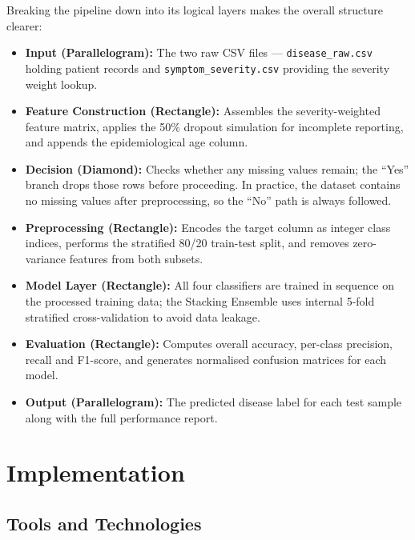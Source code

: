 \documentclass[12pt,a4paper]{article}
\begin{document}
\noindent
Breaking the pipeline down into its logical layers makes the overall structure clearer:

\begin{itemize}
    \item \textbf{Input (Parallelogram):} The two raw CSV files --- \texttt{disease\_raw.csv} holding patient records and \texttt{symptom\_severity.csv} providing the severity weight lookup.
    \item \textbf{Feature Construction (Rectangle):} Assembles the severity-weighted feature matrix, applies the 50\% dropout simulation for incomplete reporting, and appends the epidemiological age column.
    \item \textbf{Decision (Diamond):} Checks whether any missing values remain; the ``Yes'' branch drops those rows before proceeding. In practice, the dataset contains no missing values after preprocessing, so the ``No'' path is always followed.
    \item \textbf{Preprocessing (Rectangle):} Encodes the target column as integer class indices, performs the stratified 80/20 train-test split, and removes zero-variance features from both subsets.
    \item \textbf{Model Layer (Rectangle):} All four classifiers are trained in sequence on the processed training data; the Stacking Ensemble uses internal 5-fold stratified cross-validation to avoid data leakage.
    \item \textbf{Evaluation (Rectangle):} Computes overall accuracy, per-class precision, recall and F1-score, and generates normalised confusion matrices for each model.
    \item \textbf{Output (Parallelogram):} The predicted disease label for each test sample along with the full performance report.
\end{itemize}

\section{Implementation}

\subsection{Tools and Technologies}
\end{document}
